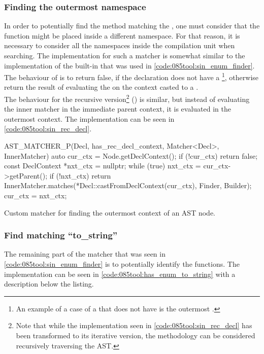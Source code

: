 \subsubsection*{Finding the outermost namespace}
In order to potentially find the  method matching the , one must consider that the function might be placed inside a different namespace.
For that reason, it is necessary to consider all the namespaces inside the compilation unit when searching.
The implementation for such a matcher is somewhat similar to the implementation of the built-in  that was used in \cref{code:085tool:sin_enum_finder}. 
The behaviour of  is to return false, if the declaration does not have a \footnote{
    An example of a case of a  that does not have  is the outermost .
}, otherwise return the result of evaluating the  on the context casted to a .\\
The behaviour for the recursive version\footnote{Note that while the implementation seen in \cref{code:085tool:sin_rec_decl} has been transformed to its iterative version, the methodology can be considered recursively traversing the AST.} 
() is similar, but instead of evaluating the inner matcher in the immediate parent context, it is evaluated in the outermost context. The implementation can be seen in \cref{code:085tool:sin_rec_decl}.

\begin{listing}[H]
    \begin{cppcode}
AST_MATCHER_P(Decl, has_rec_decl_context, Matcher<Decl>, InnerMatcher) {
	auto cur_ctx = Node.getDeclContext();
	if (!cur_ctx) {
		return false;
	}
	const DeclContext *nxt_ctx = nullptr;
	while (true) {
		nxt_ctx = cur_ctx->getParent();
		if (!nxt_ctx) {
			return InnerMatcher.matches(*Decl::castFromDeclContext(cur_ctx), Finder, Builder);
		}
		cur_ctx = nxt_ctx;
	}
}
    \end{cppcode}
    \caption{Custom matcher for finding the outermost context of an AST node.}
    \label{code:085tool:sin_rec_decl}
\end{listing}

\subsubsection*{Find matching ``to\_string''}
The remaining part of the  matcher that was seen in \cref{code:085tool:sin_enum_finder} is to potentially identify the  functions. The implementation can be seen in \cref{code:085tool:has_enum_to_string} with a description below the listing.


